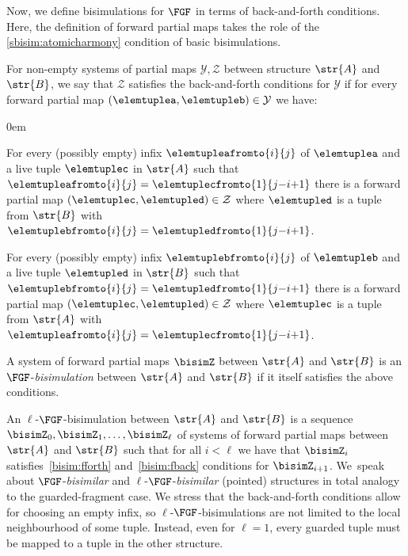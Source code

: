 Now, we define bisimulations for $\FGF$ in terms of back-and-forth conditions.
Here, the definition of forward partial maps takes the role of the \ref{sbisim:atomicharmony} condition of basic bisimulations.
\begin{definition}
  For non-empty systems of partial maps $\mathcal{Y}, \mathcal{Z}$ between structure $\str{A}$ and $\str{B}$, we say that $\mathcal{Z}$ satisfies the back-and-forth conditions for $\mathcal{Y}$ if for every forward partial map $(\elemtuplea, \elemtupleb) \in \mathcal{Y}$ we have:
  \begin{description}\itemsep0em
    \item[\desclabel{(fForth)}{bisim:fforth}] For every (possibly empty) infix $\elemtupleafromto{i}{j}$ of $\elemtuplea$ and a live tuple $\elemtuplec$ in $\str{A}$ such that $\elemtupleafromto{i}{j} = \elemtuplecfromto{1}{j{-}i{+}1}$ there is a forward partial map $(\elemtuplec, \elemtupled) \in \mathcal{Z}$ where $\elemtupled$ is a tuple from $\str{B}$ with $\elemtuplebfromto{i}{j} = \elemtupledfromto{1}{j{-}i{+}1}$.
    \item[\desclabel{(fBack)}{bisim:fback}] For every (possibly empty) infix $\elemtuplebfromto{i}{j}$ of $\elemtupleb$ and a live tuple $\elemtupled$ in $\str{B}$ such that $\elemtuplebfromto{i}{j} = \elemtupledfromto{1}{j{-}i{+}1}$ there is a forward partial map $(\elemtuplec, \elemtupled) \in \mathcal{Z}$ where $\elemtuplec$ is a tuple from $\str{A}$ with $\elemtupleafromto{i}{j} = \elemtuplecfromto{1}{j{-}i{+}1}$.
  \end{description}
  A system of forward partial maps $\bisimZ$ between $\str{A}$ and $\str{B}$ is an $\FGF$-\emph{bisimulation} between $\str{A}$ and $\str{B}$ if it itself satisfies the above conditions.
\end{definition}
An $\ell$-$\FGF$-bisimulation between $\str{A}$ and $\str{B}$ is a sequence $\bisimZ_0, \bisimZ_1, \ldots, \bisimZ_\ell$ of systems of forward partial maps between $\str{A}$ and $\str{B}$ such that for all $i < \ell$ we have that $\bisimZ_i$ satisfies~\ref{bisim:fforth} and~\ref{bisim:fback} conditions for $\bisimZ_{i{+}1}$.
We~speak about $\FGF$-\emph{bisimilar} and $\ell$-$\FGF$-\emph{bisimilar} (pointed) structures in total analogy to the guarded-fragment case.
We stress that the back-and-forth conditions allow for choosing an empty infix, so $\ell$-$\FGF$-bisimulations are not limited to the local neighbourhood of some tuple.
Instead, even for $\ell = 1$, every guarded tuple must be mapped to a tuple in the other structure.


